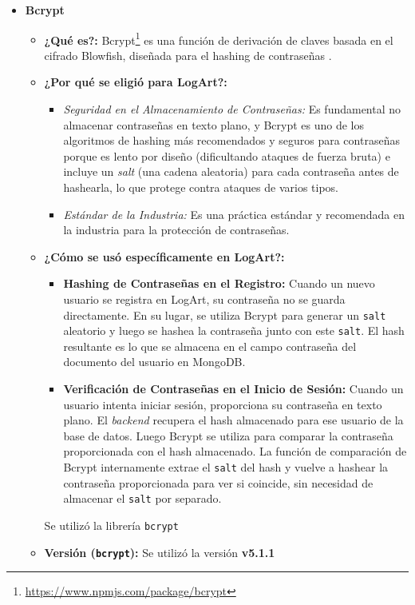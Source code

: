 \begin{itemize}
        \item  \textbf{Bcrypt}
            \begin{itemize}
                \item \textbf{¿Qué es?:} Bcrypt\footnote{\url{https://www.npmjs.com/package/bcrypt}} es una función de derivación de claves basada en el cifrado Blowfish, diseñada para el hashing de contraseñas \cite{webempresaBcrypt}.
                \item \textbf{¿Por qué se eligió para LogArt?:}
                    \begin{itemize}
                        \item \textit{Seguridad en el Almacenamiento de Contraseñas:} Es fundamental no almacenar contraseñas en texto plano, y Bcrypt es uno de los algoritmos de hashing más recomendados y seguros para contraseñas porque es lento por diseño (dificultando ataques de fuerza bruta) e incluye un \textit{salt} (una cadena aleatoria) para cada contraseña antes de hashearla, lo que protege contra ataques de varios tipos.
                        \item \textit{Estándar de la Industria:} Es una práctica estándar y recomendada en la industria para la protección de contraseñas.
                    \end{itemize}
            \item \textbf{¿Cómo se usó específicamente en LogArt?:}
                \begin{itemize}
                    \item \textbf{Hashing de Contraseñas en el Registro:} Cuando un nuevo usuario se registra en LogArt, su contraseña no se guarda directamente. En su lugar, se utiliza Bcrypt para generar un \texttt{salt} aleatorio y luego se hashea la contraseña junto con este \texttt{salt}. El hash resultante es lo que se almacena en el campo contraseña del documento del usuario en MongoDB.
                    \item \textbf{Verificación de Contraseñas en el Inicio de Sesión:} Cuando un usuario intenta iniciar sesión, proporciona su contraseña en texto plano. El \textit{backend} recupera el hash almacenado para ese usuario de la base de datos. Luego Bcrypt se utiliza para comparar la contraseña proporcionada con el hash almacenado. La función de comparación de Bcrypt internamente extrae el \texttt{salt} del hash y vuelve a hashear la contraseña proporcionada para ver si coincide, sin necesidad de almacenar el \texttt{salt} por separado.
                \end{itemize}
            Se utilizó la librería \texttt{bcrypt}
            \item \textbf{Versión (\texttt{bcrypt}):} Se utilizó la versión \textbf{v5.1.1}
            \end{itemize}
\end{itemize}

